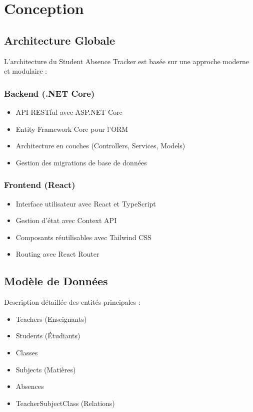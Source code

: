 \section{Conception}
\label{sec:conception}

\subsection{Architecture Globale}
L'architecture du Student Absence Tracker est basée sur une approche moderne et modulaire :

\subsubsection{Backend (.NET Core)}
\begin{itemize}
    \item API RESTful avec ASP.NET Core
    \item Entity Framework Core pour l'ORM
    \item Architecture en couches (Controllers, Services, Models)
    \item Gestion des migrations de base de données
\end{itemize}

\subsubsection{Frontend (React)}
\begin{itemize}
    \item Interface utilisateur avec React et TypeScript
    \item Gestion d'état avec Context API
    \item Composants réutilisables avec Tailwind CSS
    \item Routing avec React Router
\end{itemize}

\subsection{Modèle de Données}
Description détaillée des entités principales :
\begin{itemize}
    \item Teachers (Enseignants)
    \item Students (Étudiants)
    \item Classes
    \item Subjects (Matières)
    \item Absences
    \item TeacherSubjectClass (Relations)
\end{itemize}
